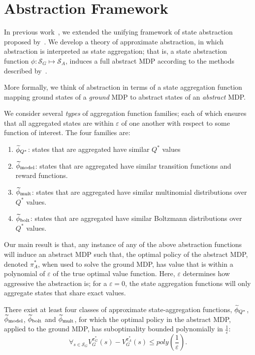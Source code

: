 \section{Abstraction Framework}

In previous work~\cite{abelhershko2016approx}, we extended the unifying framework of state abstraction proposed by~\cite{li2006towards}. We develop a theory of approximate abstraction, in which abstraction is interpreted as state aggregation; that is, a state abstraction function $\phi : \mathcal{S}_G \mapsto \mathcal{S}_A$, induces a full abstract \ac{MDP} according to the methods described by~\cite{li2006towards}.

More formally, we think of abstraction in terms of a state aggregation function mapping ground states of a {\it ground} MDP to abstract states of an {\it abstract} MDP.

We consider several {\it types} of aggregation function families; each of which ensures that all aggregated states are within $\varepsilon$ of one another with respect to some function of interest. The four families are:
\begin{enumerate}
\item $\widetilde \phi_{Q^*}$: states that are aggregated have similar $Q^*$ values
\item $\widetilde \phi_{\text{model}}$: states that are aggregated have similar transition functions and reward functions.
\item $\widetilde \phi_{\text{mult}}$: states that are aggregated have similar multinomial distributions over $Q^*$ values.
\item $\widetilde \phi_{\text{bolt}}$: states that are aggregated have similar Boltzmann distributions over $Q^*$ values.
\end{enumerate}

Our main result is that, any instance of any of the above abstraction functions will induce an abstract \ac{MDP} such that, the optimal policy of the abstract MDP, denoted $\pi_A^*$, when used to solve the ground MDP, has value that is within a polynomial of $\varepsilon$ of the true optimal value function. Here, $\varepsilon$ determines how aggressive the abstraction is; for a $\varepsilon=0$, the state aggregation functions will only aggregate states that share exact values.

\begin{thm}
There exist at least four classes of approximate state-aggregation functions, $\widetilde \phi_{Q^*}$, $\widetilde \phi_{\text{model}}$, $\widetilde \phi_{\text{bolt}}$ and $\widetilde \phi_{\text{mult}}$, for which the optimal policy in the abstract \ac{MDP}, applied to the ground \ac{MDP}, has suboptimality bounded polynomially in $\frac{1}{\varepsilon}$:
\begin{equation}
\forall_{s \in \mathcal{S}_G} V_G^{\pi_G^*}(s) - V_G^{\pi_{A}^*}(s) \leq poly \left (\frac{1}{\varepsilon} \right).
\end{equation}
\end{thm}

